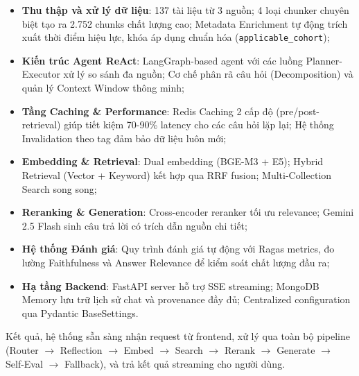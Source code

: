 \documentclass[../DoAn.tex]{subfiles}
\begin{document}
\begin{itemize}
    \item \textbf{Thu thập và xử lý dữ liệu}: 137 tài liệu từ 3 nguồn; 4 loại chunker chuyên biệt tạo ra 2.752 chunks chất lượng cao; Metadata Enrichment tự động trích xuất thời điểm hiệu lực, khóa áp dụng chuẩn hóa (\texttt{applicable\_cohort});
    
    \item \textbf{Kiến trúc Agent ReAct}: LangGraph-based agent với các luồng Planner-Executor xử lý so sánh đa nguồn; Cơ chế phân rã câu hỏi (Decomposition) và quản lý Context Window thông minh;
    
    \item \textbf{Tầng Caching \& Performance}: Redis Caching 2 cấp độ (pre/post-retrieval) giúp tiết kiệm 70-90\% latency cho các câu hỏi lặp lại; Hệ thống Invalidation theo tag đảm bảo dữ liệu luôn mới;
    
    \item \textbf{Embedding \& Retrieval}: Dual embedding (BGE-M3 + E5); Hybrid Retrieval (Vector + Keyword) kết hợp qua RRF fusion; Multi-Collection Search song song;
    
    \item \textbf{Reranking \& Generation}: Cross-encoder reranker tối ưu relevance; Gemini 2.5 Flash sinh câu trả lời có trích dẫn nguồn chi tiết;
    
    \item \textbf{Hệ thống Đánh giá}: Quy trình đánh giá tự động với Ragas metrics, đo lường Faithfulness và Answer Relevance để kiểm soát chất lượng đầu ra;
    
    \item \textbf{Hạ tầng Backend}: FastAPI server hỗ trợ SSE streaming; MongoDB Memory lưu trữ lịch sử chat và provenance đầy đủ; Centralized configuration qua Pydantic BaseSettings.
\end{itemize}

Kết quả, hệ thống sẵn sàng nhận request từ frontend, xử lý qua toàn bộ pipeline (Router $\rightarrow$ Reflection $\rightarrow$ Embed $\rightarrow$ Search $\rightarrow$ Rerank $\rightarrow$ Generate $\rightarrow$ Self-Eval $\rightarrow$ Fallback), và trả kết quả streaming cho người dùng.
\end{document}
